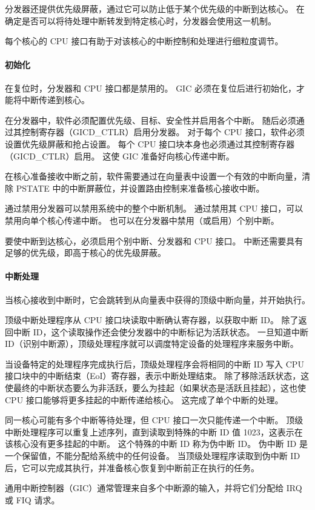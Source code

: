 分发器还提供优先级屏蔽，通过它可以防止低于某个优先级的中断到达核心。
在确定是否可以将待处理中断转发到特定核心时，分发器会使用这一机制。

每个核心的 CPU 接口有助于对该核心的中断控制和处理进行细粒度调节。

\paragraph*{初始化}

在复位时，分发器和 CPU 接口都是禁用的。
GIC 必须在复位后进行初始化，才能将中断传递到核心。

在分发器中，软件必须配置优先级、目标、安全性并启用各个中断。
随后必须通过其控制寄存器（GICD\_CTLR）启用分发器。
对于每个 CPU 接口，软件必须设置优先级屏蔽和抢占设置。
每个 CPU 接口块本身也必须通过其控制寄存器（GICD\_CTLR）启用。
这使 GIC 准备好向核心传递中断。

在核心准备接收中断之前，软件需要通过在向量表中设置一个有效的中断向量，清除
PSTATE 中的中断屏蔽位，并设置路由控制来准备核心接收中断。

通过禁用分发器可以禁用系统中的整个中断机制。
通过禁用其 CPU 接口，可以禁用向单个核心传递中断。
也可以在分发器中禁用（或启用）个别中断。

要使中断到达核心，必须启用个别中断、分发器和 CPU 接口。
中断还需要具有足够的优先级，即高于核心的优先级屏蔽。

\paragraph*{中断处理}

当核心接收到中断时，它会跳转到从向量表中获得的顶级中断向量，并开始执行。

顶级中断处理程序从 CPU 接口块读取中断确认寄存器，以获取中断 ID。
除了返回中断 ID，这个读取操作还会使分发器中的中断标记为活跃状态。
一旦知道中断 ID（识别中断源），顶级处理程序就可以调度特定设备的处理程序来服务中断。

当设备特定的处理程序完成执行后，顶级处理程序会将相同的中断 ID 写入 CPU 接口块中的中断结束（EoI）寄存器，表示中断处理结束。
除了移除活跃状态，这使最终的中断状态要么为非活跃，要么为挂起（如果状态是活跃且挂起），这也使
CPU 接口能够将更多挂起的中断传递给核心。
这完成了单个中断的处理。

同一核心可能有多个中断等待处理，但 CPU 接口一次只能传递一个中断。
顶级中断处理程序可以重复上述序列，直到读取到特殊的中断
ID 值 1023，这表示在该核心没有更多挂起的中断。
这个特殊的中断 ID 称为伪中断 ID。
伪中断 ID 是一个保留值，不能分配给系统中的任何设备。
当顶级处理程序读取到伪中断 ID 后，它可以完成其执行，并准备核心恢复到中断前正在执行的任务。

通用中断控制器（GIC）通常管理来自多个中断源的输入，并将它们分配给 IRQ 或 FIQ 请求。

